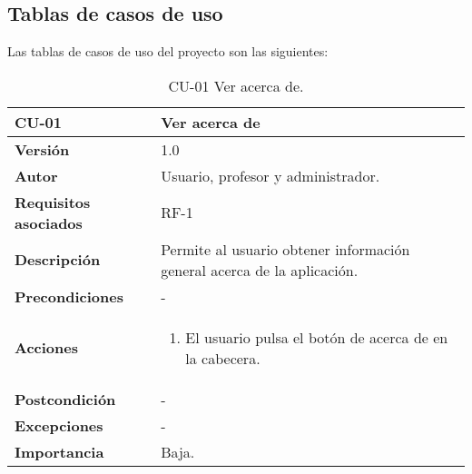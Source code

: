 \subsection{Tablas de casos de uso}
Las tablas de casos de uso del proyecto son las siguientes:
\begin{table}[h!]
	\centering
	\begin{tabularx}{\linewidth}{ p{} p{} }
		\toprule
		\textbf{CU-01}    & \textbf{Ver acerca de}\\
		\toprule
		\textbf{Versión}              & 1.0    \\
		\textbf{Autor}                & Usuario, profesor y administrador. \\
		\textbf{Requisitos asociados} & RF-1\\
		\textbf{Descripción}          & Permite al usuario obtener información general acerca de la aplicación. \\
		\textbf{Precondiciones}         & - \\
		\textbf{Acciones}             &
		\begin{enumerate}
			\def\labelenumi{\arabic{enumi}.}
			\tightlist
			\item El usuario pulsa el botón de acerca de en la cabecera.
		\end{enumerate}\\
         \textbf{Postcondición}             & - \\
		\textbf{Excepciones}             & - \\
		\textbf{Importancia}          & Baja. \\
		\bottomrule
	\end{tabularx}
	\caption{CU-01 Ver acerca de.}
\end{table}

